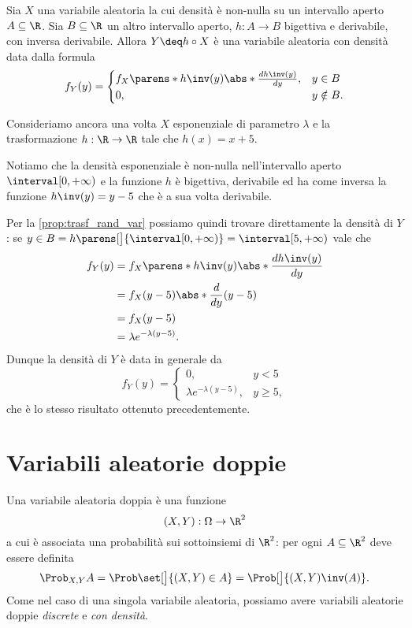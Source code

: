 \begin{proposition} \label{prop:trasf_rand_var}
    Sia $X$ una variabile aleatoria la cui densità è non-nulla su un intervallo aperto $A \subseteq \R$. Sia $B \subseteq \R$ un altro intervallo aperto, $h : A \to B$ bigettiva e derivabile, con inversa derivabile. Allora $Y \deq h \circ X$ è una variabile aleatoria con densità data dalla formula \[
        f_Y(y) = \begin{cases}
            f_X\parens*{h\inv(y)} \abs*{\frac{dh\inv(y)}{dy}}, &y \in B\\
            0, &y \notin B.
        \end{cases}    
    \]
\end{proposition}

\begin{example}
    Consideriamo ancora una volta $X$ esponenziale di parametro $\lambda$ e la trasformazione $h : \R \to \R$ tale che $h(x) = x + 5$.

    Notiamo che la densità esponenziale è non-nulla nell'intervallo aperto $\interval[{0, +\infty})$ e la funzione $h$ è bigettiva, derivabile ed ha come inversa la funzione $h\inv(y) = y - 5$ che è a sua volta derivabile. 
    
    Per la \autoref{prop:trasf_rand_var} possiamo quindi trovare direttamente la densità di $Y$:
    se $y \in B = h\parens[\big]{\interval[{0, +\infty})} = \interval[{5, +\infty})$ vale che \begin{align*}
        f_Y(y) &= f_X\parens*{h\inv(y)} \abs*{\frac{dh\inv(y)}{dy}}\\
        &= f_X(y - 5) \abs*{\frac{d}{dy}(y - 5)}\\
        &= f_X(y-5)\\
        &= \lambda e^{-\lambda(y-5)}.
    \end{align*} Dunque la densità di $Y$ è data in generale da \[
        f_Y(y) = \begin{cases}
            0, &y < 5\\
            \lambda e^{-\lambda(y-5)}, &y \geq 5,
        \end{cases}
    \] che è lo stesso risultato ottenuto precedentemente.
\end{example}

\section{Variabili aleatorie doppie}

Una variabile aleatoria doppia è una funzione \[
    (X, Y) : \Omega \to \R^2    
\] a cui è associata una probabilità sui sottoinsiemi di $\R^2$: per ogni $A \subseteq \R^2$ deve essere definita \[
    \Prob_{X, Y}{A} = \Prob\set[\big]{(X, Y) \in A} = \Prob[\big]{(X, Y)\inv (A)}.   
\]
Come nel caso di una singola variabile aleatoria, possiamo avere variabili aleatorie doppie \emph{discrete} e \emph{con densità}.

